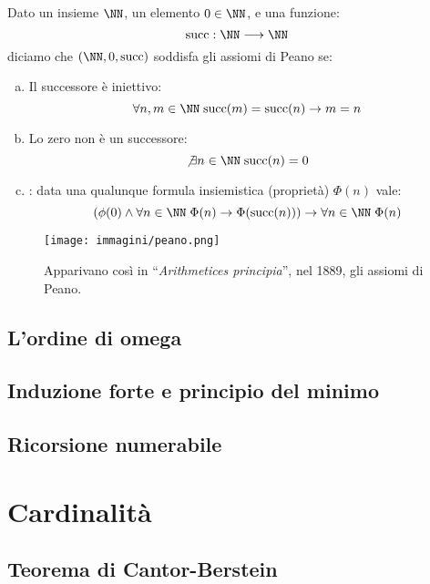 \documentclass[11pt]{scrartcl}
\begin{document}
\begin{definition}
	Dato un insieme $\NN$, un elemento $0 \in \NN$, e una funzione:
	\[ \text{succ} : \NN \longrightarrow \NN
		\]
	diciamo che $(\NN,0,\text{succ})$ soddisfa gli assiomi di Peano se:
	\begin{enumerate}[(a)]
		\item Il successore è iniettivo:
		\[ \forall n,m \in \NN \; \text{succ}(m) = \text{succ}(n) \rightarrow m = n
			\]
		\item Lo zero non è un successore:
		\[ \not\exists n \in \NN \; \text{succ}(n) = 0
			\]
		\item {}: data una qualunque formula insiemistica (proprietà) $\Phi(n)$ vale:
		\[ (\phi(0) \land \forall n \in \NN \; \Phi(n) \rightarrow \Phi(\text{succ}(n))) \rightarrow \forall n \in \NN \; \Phi(n)
			\]
	\end{enumerate}
\end{definition}

\begin{center}
	\begin{figure*}[h]
		\centering
		\texttt{[image: immagini/peano.png]}
		\captionsetup{labelformat=empty}
		\caption{Apparivano così in ``\emph{Arithmetices principia}'', nel 1889, gli assiomi di Peano.}
	\end{figure*}
\end{center}

\newpage
\subsection{L'ordine di omega}
\newpage
\subsection{Induzione forte e principio del minimo}
\newpage
\subsection{Ricorsione numerabile}




\newpage
\section{Cardinalità}
\subsection{Teorema di Cantor-Berstein}
\newpage
\end{document}
